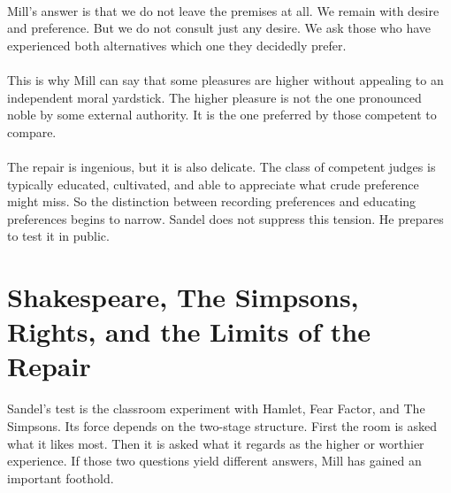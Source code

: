 \paragraph{}
Mill's answer is that we do not leave the premises at all. We remain with desire and preference. But we do not consult just any desire. We ask those who have experienced both alternatives which one they decidedly prefer.

\paragraph{}
This is why Mill can say that some pleasures are higher without appealing to an independent moral yardstick. The higher pleasure is not the one pronounced noble by some external authority. It is the one preferred by those competent to compare.

\paragraph{}
The repair is ingenious, but it is also delicate. The class of competent judges is typically educated, cultivated, and able to appreciate what crude preference might miss. So the distinction between recording preferences and educating preferences begins to narrow. Sandel does not suppress this tension. He prepares to test it in public.

\section{Shakespeare, The Simpsons, Rights, and the Limits of the Repair}

Sandel's test is the classroom experiment with Hamlet, Fear Factor, and The Simpsons. Its force depends on the two-stage structure. First the room is asked what it likes most. Then it is asked what it regards as the higher or worthier experience. If those two questions yield different answers, Mill has gained an important foothold.

\begin{table}
\centering
{}%
\end{table}

